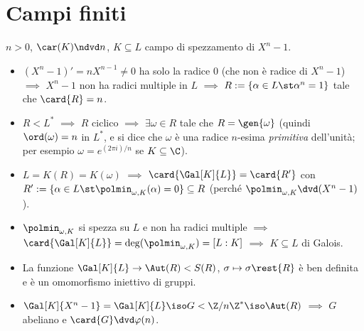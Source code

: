 
\section{Campi finiti}






\(n>0\), \(\car(K)\ndvd n\), \(K\subseteq L\) campo di spezzamento di \(X^n-1\).
\begin{itemize}
\item \((X^n-1)'=nX^{n-1}\ne0\) ha solo la radice \(0\) (che non è radice di \(X^n-1\)) \(\implies\) \(X^n-1\) non ha radici multiple in \(L\) \(\implies\) \(R:=\{\alpha\in L\st\alpha^n=1\}\) tale che \(\card{R}=n\).
\item \(R<L^*\) \(\implies\) \(R\) ciclico \(\implies\) \(\exi\omega\in R\) tale che \(R=\gen{\omega}\) (quindi \(\ord(\omega)=n\) in \(L^*\), e si dice che \(\omega\) è una radice \(n\)-esima {\em primitiva} dell'unit\`a; per esempio \(\omega=e^{(2\pi i)/n}\) se \(K\subseteq\C\)).
\item \(L=K(R)=K(\omega)\) \(\implies\) \(\card{\Gal[K]{L}}=\card{R'}\) con \(R':=\{\alpha\in L\st\polmin_{\omega,K}(\alpha)=0\}\subseteq R\) (perché \(\polmin_{\omega,K}\dvd(X^n-1)\)).
\item \(\polmin_{\omega,K}\) si spezza su \(L\) e non ha radici multiple \(\implies\) \(\card{\Gal[K]{L}}=\deg(\polmin_{\omega,K})=[L:K]\) \(\implies\) \(K\subseteq L\) di Galois.
\item La funzione \(\Gal[K]{L}\to\Aut(R)<S(R)\), \(\sigma\mapsto\sigma\rest{R}\) è ben definita e è un omomorfismo iniettivo di gruppi.
\item \(\Gal[K]{X^n-1}=\Gal[K]{L}\iso G<\Z/n\Z^*\iso\Aut(R)\) \(\implies\) \(G\) abeliano e \(\card{G}\dvd\varphi(n)\).
\end{itemize}



